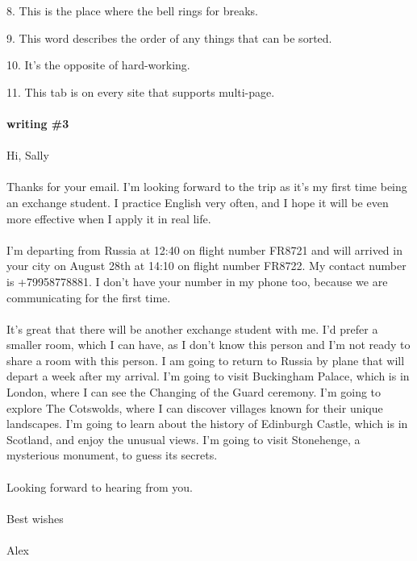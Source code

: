 \documentclass{article}
\begin{document}
8. This is the place where the bell rings for breaks.

9. This word describes the order of any things that can be sorted.

10. It's the opposite of hard-working.

11. This tab is on every site that supports multi-page.
\\ \\
\textbf{writing \#3}\\ \\
Hi, Sally\\
\\
Thanks for your email. I'm looking forward to the trip as it's my first time being an exchange student. I practice English very often, and I hope it will be even more effective when I apply it in real life.
\\ \\
I'm departing from Russia at 12:40 on flight number FR8721 and will arrived in your city on August 28th at 14:10 on flight number FR8722. My contact number is +79958778881. I don't have your number in my phone too, because we are communicating for the first time.
\\ \\
It's great that there will be another exchange student with me. I'd prefer a smaller room, which I can have, as I don't know this person and I'm not ready to share a room with this person. 
I am going to return to Russia by plane that will depart a week after my arrival.
I'm going to visit Buckingham Palace, which is in London, where I can see the Changing of the Guard ceremony.
I'm going to explore The Cotswolds, where I can discover villages known for their unique landscapes.
I'm going to learn about the history of Edinburgh Castle, which is in Scotland, and enjoy the unusual views.
I'm going to visit Stonehenge, a mysterious monument, to guess its secrets.
\\ \\
Looking forward to hearing from you.
\\ \\
Best wishes
\\ \\ 
Alex
\end{document}

